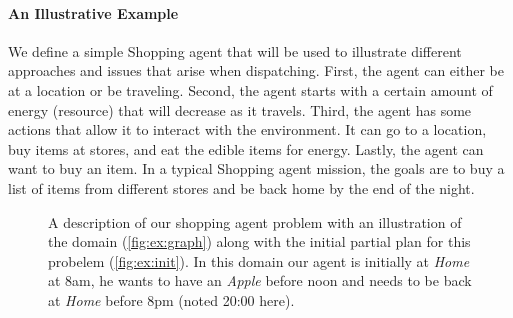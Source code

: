 \paragraph{An Illustrative Example} We define a simple Shopping agent
that will be used to illustrate different approaches and issues that
arise when dispatching. First, the agent can either be at a location or be
traveling. Second, the agent starts with a certain amount of
energy (resource) that will decrease as it travels. Third, the agent has some
actions that allow it to interact with the environment. It can go to a location,
buy items at stores, and eat the edible items for energy. Lastly, the agent can
want to buy an item. In a typical Shopping agent mission,
the goals are to buy a list of items from different stores and be back
home by the end of the night. 

\begin{figure}
  \centering
{}
\hfill
{}
\caption{A description of our shopping agent problem with an
  illustration of the domain (\ref{fig:ex:graph}) along with the initial
  partial plan for this probelem (\ref{fig:ex:init}). In this domain
  our agent is initially at {\em Home} at 8am, he wants to have an
  {\em Apple}
  before noon and needs to be back 
  at {\em Home} before 8pm (noted 20:00 here).}
\label{fig:Example}
\end{figure}

